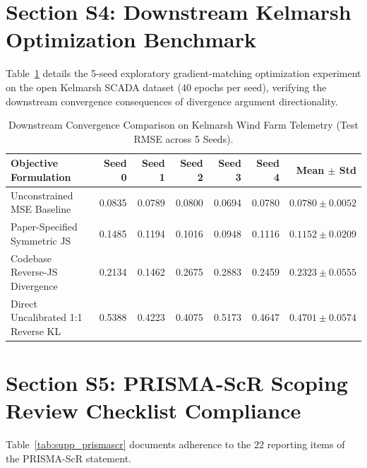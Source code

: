 \documentclass[3p,times]{elsarticle}
\begin{document}
\newpage
\section*{Section S4: Downstream Kelmarsh Optimization Benchmark}

Table~\ref{tab:supp_gradmatch} details the 5-seed exploratory gradient-matching optimization experiment on the open Kelmarsh SCADA dataset (40 epochs per seed), verifying the downstream convergence consequences of divergence argument directionality.

\begin{table}[h]
\centering
\small
\caption{Downstream Convergence Comparison on Kelmarsh Wind Farm Telemetry (Test RMSE across 5 Seeds).}
\label{tab:supp_gradmatch}
\begin{tabular}{lrrrrrr}
\toprule
\textbf{Objective Formulation} & \textbf{Seed 0} & \textbf{Seed 1} & \textbf{Seed 2} & \textbf{Seed 3} & \textbf{Seed 4} & \textbf{Mean $\pm$ Std} \\
\midrule
Unconstrained MSE Baseline & 0.0835 & 0.0789 & 0.0800 & 0.0694 & 0.0780 & $\mathbf{0.0780 \pm 0.0052}$ \\
Paper-Specified Symmetric JS & 0.1485 & 0.1194 & 0.1016 & 0.0948 & 0.1116 & $0.1152 \pm 0.0209$ \\
Codebase Reverse-JS Divergence & 0.2134 & 0.1462 & 0.2675 & 0.2883 & 0.2459 & $0.2323 \pm 0.0555$ \\
Direct Uncalibrated 1:1 Reverse KL & 0.5388 & 0.4223 & 0.4075 & 0.5173 & 0.4647 & $0.4701 \pm 0.0574$ \\
\bottomrule
\end{tabular}
\end{table}

\section*{Section S5: PRISMA-ScR Scoping Review Checklist Compliance}

Table~\ref{tab:supp_prismascr} documents adherence to the 22 reporting items of the PRISMA-ScR statement.
\end{document}
